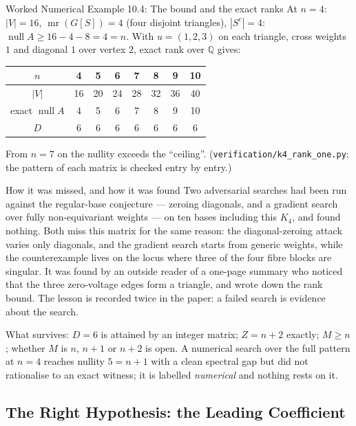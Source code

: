 \documentclass[11pt]{article}
\begin{document}
\begin{callbox}{Worked Numerical Example 10.4: The bound and the exact ranks}
At $n=4$: $|V|=16$, $\operatorname{mr}(G[S])=4$ (four disjoint triangles), $|S^c|=4$: $\operatorname{null}A\ge16-4-8=4=n$. With $u=(1,2,3)$ on each triangle, cross weights $1$ and diagonal $1$ over vertex $2$, exact rank over $\mathbb Q$ gives:
\begin{center}
\begin{tabular}{c|ccccccc}
$n$ & 4 & 5 & 6 & 7 & 8 & 9 & 10\\ \hline
$|V|$ & 16 & 20 & 24 & 28 & 32 & 36 & 40\\
exact $\operatorname{null}A$ & 4 & 5 & 6 & 7 & 8 & 9 & 10\\
$D$ & 6 & 6 & 6 & 6 & 6 & 6 & 6
\end{tabular}
\end{center}
From $n=7$ on the nullity exceeds the ``ceiling''. (\texttt{verification/k4\_rank\_one.py}; the pattern of each matrix is checked entry by entry.)
\end{callbox}

\begin{callbox}{How it was missed, and how it was found}
Two adversarial searches had been run against the regular-base conjecture --- zeroing diagonals, and a gradient search over fully non-equivariant weights --- on ten bases including this $K_4$, and found nothing. Both miss this matrix for the same reason: the diagonal-zeroing attack varies only diagonals, and the gradient search starts from generic weights, while the counterexample lives on the locus where three of the four fibre blocks are singular. It was found by an outside reader of a one-page summary who noticed that the three zero-voltage edges form a triangle, and wrote down the rank bound. The lesson is recorded twice in the paper: a failed search is evidence about the search.

What survives: $D=6$ is attained by an integer matrix; $Z=n+2$ exactly; $M\ge n$; whether $M$ is $n$, $n+1$ or $n+2$ is open. A numerical search over the full pattern at $n=4$ reaches nullity $5=n+1$ with a clean spectral gap but did not rationalise to an exact witness; it is labelled \emph{numerical} and nothing rests on it.
\end{callbox}

\subsection{The Right Hypothesis: the Leading Coefficient}
\end{document}
